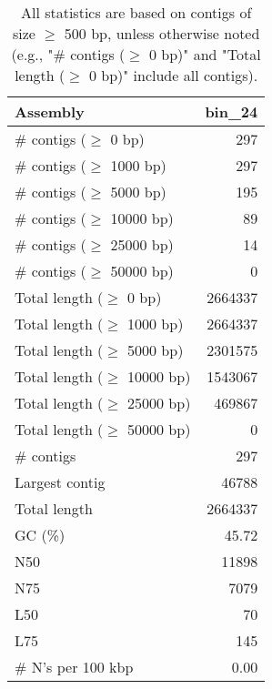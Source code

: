\documentclass[12pt,a4paper]{article}
\begin{document}
\begin{table}[ht]
\begin{center}
\caption{All statistics are based on contigs of size $\geq$ 500 bp, unless otherwise noted (e.g., "\# contigs ($\geq$ 0 bp)" and "Total length ($\geq$ 0 bp)" include all contigs).}
\begin{tabular}{|l*{1}{|r}|}
\hline
Assembly & bin\_24 \\ \hline
\# contigs ($\geq$ 0 bp) & 297 \\ \hline
\# contigs ($\geq$ 1000 bp) & 297 \\ \hline
\# contigs ($\geq$ 5000 bp) & 195 \\ \hline
\# contigs ($\geq$ 10000 bp) & 89 \\ \hline
\# contigs ($\geq$ 25000 bp) & 14 \\ \hline
\# contigs ($\geq$ 50000 bp) & 0 \\ \hline
Total length ($\geq$ 0 bp) & 2664337 \\ \hline
Total length ($\geq$ 1000 bp) & 2664337 \\ \hline
Total length ($\geq$ 5000 bp) & 2301575 \\ \hline
Total length ($\geq$ 10000 bp) & 1543067 \\ \hline
Total length ($\geq$ 25000 bp) & 469867 \\ \hline
Total length ($\geq$ 50000 bp) & 0 \\ \hline
\# contigs & 297 \\ \hline
Largest contig & 46788 \\ \hline
Total length & 2664337 \\ \hline
GC (\%) & 45.72 \\ \hline
N50 & 11898 \\ \hline
N75 & 7079 \\ \hline
L50 & 70 \\ \hline
L75 & 145 \\ \hline
\# N's per 100 kbp & 0.00 \\ \hline
\end{tabular}
\end{center}
\end{table}
\end{document}
